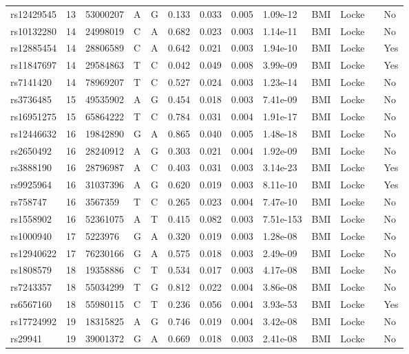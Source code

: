 \documentclass[11pt,twoside]{bristolthesis}
\begin{document}
\begin{longtable}[t]{lrlllrrrlllll}
rs12429545 & 13 & 53000207 & A & G & 0.133 & 0.033 & 0.005 & 1.09e-12 & BMI & Locke &  & No\\
rs10132280 & 14 & 24998019 & C & A & 0.682 & 0.023 & 0.003 & 1.14e-11 & BMI & Locke &  & No\\
rs12885454 & 14 & 28806589 & C & A & 0.642 & 0.021 & 0.003 & 1.94e-10 & BMI & Locke &  & Yes\\
\addlinespace
rs11847697 & 14 & 29584863 & T & C & 0.042 & 0.049 & 0.008 & 3.99e-09 & BMI & Locke &  & Yes\\
rs7141420 & 14 & 78969207 & T & C & 0.527 & 0.024 & 0.003 & 1.23e-14 & BMI & Locke &  & No\\
rs3736485 & 15 & 49535902 & A & G & 0.454 & 0.018 & 0.003 & 7.41e-09 & BMI & Locke &  & No\\
rs16951275 & 15 & 65864222 & T & C & 0.784 & 0.031 & 0.004 & 1.91e-17 & BMI & Locke &  & No\\
rs12446632 & 16 & 19842890 & G & A & 0.865 & 0.040 & 0.005 & 1.48e-18 & BMI & Locke &  & No\\
\addlinespace
rs2650492 & 16 & 28240912 & A & G & 0.303 & 0.021 & 0.004 & 1.92e-09 & BMI & Locke &  & No\\
rs3888190 & 16 & 28796987 & A & C & 0.403 & 0.031 & 0.003 & 3.14e-23 & BMI & Locke &  & Yes\\
rs9925964 & 16 & 31037396 & A & G & 0.620 & 0.019 & 0.003 & 8.11e-10 & BMI & Locke &  & Yes\\
rs758747 & 16 & 3567359 & T & C & 0.265 & 0.023 & 0.004 & 7.47e-10 & BMI & Locke &  & No\\
rs1558902 & 16 & 52361075 & A & T & 0.415 & 0.082 & 0.003 & 7.51e-153 & BMI & Locke &  & No\\
\addlinespace
rs1000940 & 17 & 5223976 & G & A & 0.320 & 0.019 & 0.003 & 1.28e-08 & BMI & Locke &  & No\\
rs12940622 & 17 & 76230166 & G & A & 0.575 & 0.018 & 0.003 & 2.49e-09 & BMI & Locke &  & No\\
rs1808579 & 18 & 19358886 & C & T & 0.534 & 0.017 & 0.003 & 4.17e-08 & BMI & Locke &  & No\\
rs7243357 & 18 & 55034299 & T & G & 0.812 & 0.022 & 0.004 & 3.86e-08 & BMI & Locke &  & No\\
rs6567160 & 18 & 55980115 & C & T & 0.236 & 0.056 & 0.004 & 3.93e-53 & BMI & Locke &  & Yes\\
\addlinespace
rs17724992 & 19 & 18315825 & A & G & 0.746 & 0.019 & 0.004 & 3.42e-08 & BMI & Locke &  & No\\
rs29941 & 19 & 39001372 & G & A & 0.669 & 0.018 & 0.003 & 2.41e-08 & BMI & Locke &  & No\\

\end{longtable}
\end{document}
